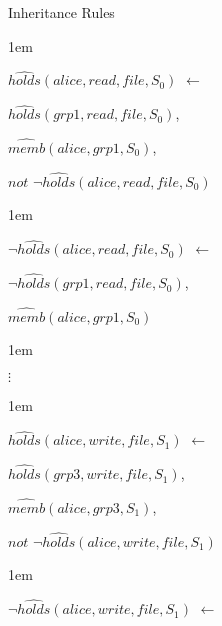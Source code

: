 \documentclass[global,twocolumn,final]{svjour}
\newenvironment{vquote}
  {\begin{list}{}{\leftmargin 1em}\item[]}
  {\end{list}}
\begin{document}
\begin{enumerate}
       \item
         Inheritance Rules

         \begin{vquote}
           $\hat{holds}(alice, read, file, S_{0})$ $\leftarrow$

           \hspace{1em}
           $\hat{holds}(grp1, read, file, S_{0})$,

           \hspace{1em}
           $\hat{memb}(alice, grp1, S_{0})$,

           \hspace{1em}
           $not$ $\lnot\hat{holds}(alice, read, file, S_{0})$
         \end{vquote}

         \begin{vquote}
           $\lnot\hat{holds}(alice, read, file, S_{0})$ $\leftarrow$

           \hspace{1em}
           $\lnot\hat{holds}(grp1, read, file, S_{0})$,

           \hspace{1em}
           $\hat{memb}(alice, grp1, S_{0})$
         \end{vquote}

         \begin{vquote}
           \hspace{2em}$\vdots$
         \end{vquote}

         \begin{vquote}
           $\hat{holds}(alice, write, file, S_{1})$ $\leftarrow$

           \hspace{1em}
           $\hat{holds}(grp3, write, file, S_{1})$,

           \hspace{1em}
           $\hat{memb}(alice, grp3, S_{1})$,

           \hspace{1em}
           $not$ $\lnot\hat{holds}(alice, write, file, S_{1})$
         \end{vquote}

         \begin{vquote}
           $\lnot\hat{holds}(alice, write, file, S_{1})$ $\leftarrow$


\end{vquote}
\end{enumerate}
\end{document}
